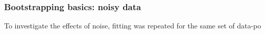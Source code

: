 \subsubsection{Bootstrapping basics: noisy data}

To investigate the effects of noise, fitting was repeated for the same set of data-po